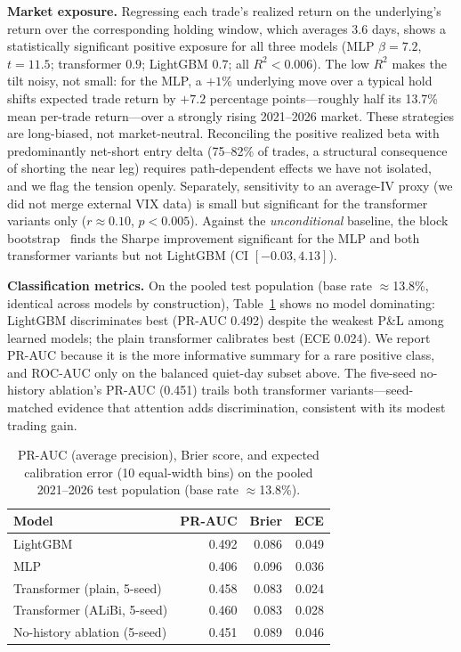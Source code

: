 \documentclass[sigconf,review]{acmart}
\begin{document}
\noindent\textbf{Market exposure.} Regressing each trade's realized return on the underlying's return over the corresponding holding window, which averages 3.6 days, shows a statistically significant positive exposure for all three models (MLP $\beta=7.2$, $t=11.5$; transformer $0.9$; LightGBM $0.7$; all $R^2<0.006$). The low $R^2$ makes the tilt noisy, not small: for the MLP, a $+1\%$ underlying move over a typical hold shifts expected trade return by $+7.2$ percentage points---roughly half its 13.7\% mean per-trade return---over a strongly rising 2021--2026 market. These strategies are long-biased, not market-neutral. Reconciling the positive realized beta with predominantly net-short entry delta (75--82\% of trades, a structural consequence of shorting the near leg) requires path-dependent effects we have not isolated, and we flag the tension openly. Separately, sensitivity to an average-IV proxy (we did not merge external VIX data) is small but significant for the transformer variants only ($r\approx0.10$, $p<0.005$). Against the \emph{unconditional} baseline, the block bootstrap~\cite{kunsch1989} finds the Sharpe improvement significant for the MLP and both transformer variants but not LightGBM (CI $[-0.03,4.13]$).

\noindent\textbf{Classification metrics.} On the pooled test population (base rate $\approx$13.8\%, identical across models by construction), Table~\ref{tab:calibration} shows no model dominating: LightGBM discriminates best (PR-AUC 0.492) despite the weakest P\&L among learned models; the plain transformer calibrates best (ECE 0.024). We report PR-AUC because it is the more informative summary for a rare positive class, and ROC-AUC only on the balanced quiet-day subset above. The five-seed no-history ablation's PR-AUC (0.451) trails both transformer variants---seed-matched evidence that attention adds discrimination, consistent with its modest trading gain.

\begin{table}[t]
\centering
\footnotesize
\begin{tabular}{lrrr}
\toprule
Model & PR-AUC & Brier & ECE \\
\midrule
LightGBM & 0.492 & 0.086 & 0.049 \\
MLP & 0.406 & 0.096 & 0.036 \\
Transformer (plain, 5-seed) & 0.458 & 0.083 & 0.024 \\
Transformer (ALiBi, 5-seed) & 0.460 & 0.083 & 0.028 \\
No-history ablation (5-seed) & 0.451 & 0.089 & 0.046 \\
\bottomrule
\end{tabular}
\caption{PR-AUC (average precision), Brier score, and expected calibration error (10 equal-width bins) on the pooled 2021--2026 test population (base rate $\approx$13.8\%).}
\label{tab:calibration}
\end{table}
\end{document}
